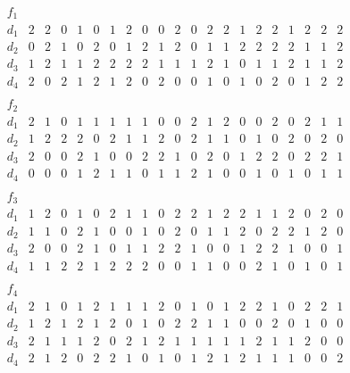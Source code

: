 $$\begin{array}{c|cccccccccccccccccccc} 
f_1 &&&&&&&&&&&&&&&&&&&&\\ 
\hline 
d_1 & 2& 2& 0& 1& 0& 1& 2& 0& 0& 2& 0& 2& 2& 1& 2& 2& 1& 2& 2& 2\\ 
d_2 & 0& 2& 1& 0& 2& 0& 1& 2& 1& 2& 0& 1& 1& 2& 2& 2& 2& 1& 1& 2\\ 
d_3 & 1& 2& 1& 1& 2& 2& 2& 2& 1& 1& 1& 2& 1& 0& 1& 1& 2& 1& 1& 2\\ 
d_4 & 2& 0& 2& 1& 2& 1& 2& 0& 2& 0& 0& 1& 0& 1& 0& 2& 0& 1& 2& 2\\ 
\end{array}$$ 
$$\begin{array}{c|cccccccccccccccccccc} 
f_2 &&&&&&&&&&&&&&&&&&&&\\ 
\hline 
d_1 & 2& 1& 0& 1& 1& 1& 1& 1& 0& 0& 2& 1& 2& 0& 0& 2& 0& 2& 1& 1\\ 
d_2 & 1& 2& 2& 2& 0& 2& 1& 1& 2& 0& 2& 1& 1& 0& 1& 0& 2& 0& 2& 0\\ 
d_3 & 2& 0& 0& 2& 1& 0& 0& 2& 2& 1& 0& 2& 0& 1& 2& 2& 0& 2& 2& 1\\ 
d_4 & 0& 0& 0& 1& 2& 1& 1& 0& 1& 1& 2& 1& 0& 0& 1& 0& 1& 0& 1& 1\\ 
\end{array}$$ 
$$\begin{array}{c|cccccccccccccccccccc} 
f_3 &&&&&&&&&&&&&&&&&&&&\\ 
\hline 
d_1 & 1& 2& 0& 1& 0& 2& 1& 1& 0& 2& 2& 1& 2& 2& 1& 1& 2& 0& 2& 0\\ 
d_2 & 1& 1& 0& 2& 1& 0& 0& 1& 0& 2& 0& 1& 1& 2& 0& 2& 2& 1& 2& 0\\ 
d_3 & 2& 0& 0& 2& 1& 0& 1& 1& 2& 2& 1& 0& 0& 1& 2& 2& 1& 0& 0& 1\\ 
d_4 & 1& 1& 2& 2& 1& 2& 2& 2& 0& 0& 1& 1& 0& 0& 2& 1& 0& 1& 0& 1\\ 
\end{array}$$ 
$$\begin{array}{c|cccccccccccccccccccc} 
f_4 &&&&&&&&&&&&&&&&&&&&\\ 
\hline 
d_1 & 2& 1& 0& 1& 2& 1& 1& 1& 2& 0& 1& 0& 1& 2& 2& 1& 0& 2& 2& 1\\ 
d_2 & 1& 2& 1& 2& 1& 2& 0& 1& 0& 2& 2& 1& 1& 0& 0& 2& 0& 1& 0& 0\\ 
d_3 & 2& 1& 1& 1& 2& 0& 2& 1& 2& 1& 1& 1& 1& 1& 2& 1& 1& 2& 0& 0\\ 
d_4 & 2& 1& 2& 0& 2& 2& 1& 0& 1& 0& 1& 2& 1& 2& 1& 1& 1& 0& 0& 2\\ 
\end{array}$$ 
